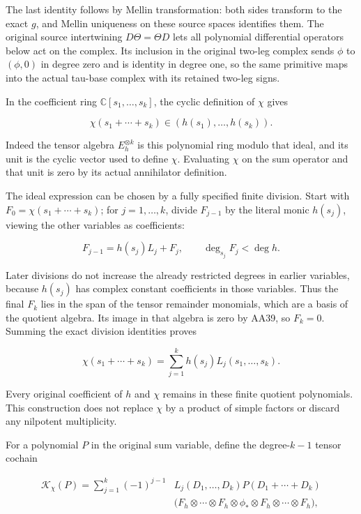\documentclass{article}
\begin{document}
The last identity follows by Mellin transformation: both sides transform to the exact \(g\), and Mellin uniqueness on these source spaces identifies them. The original source intertwining \(D\Theta=\Theta D\) lets all polynomial differential operators below act on the complex. Its inclusion in the original two-leg complex sends \(\phi\) to \((\phi,0)\) in degree zero and is identity in degree one, so the same primitive maps into the actual tau-base complex with its retained two-leg signs.

In the coefficient ring \(\mathbb C[s_1,\ldots,s_k]\), the cyclic definition of \(\chi\) gives

\[
\chi(s_1+\cdots+s_k)\in(h(s_1),\ldots,h(s_k)).
\tag{AA39}
\]

Indeed the tensor algebra \(E_h^{\otimes k}\) is this polynomial ring modulo that ideal, and its unit is the cyclic vector used to define \(\chi\). Evaluating \(\chi\) on the sum operator and that unit is zero by its actual annihilator definition.

The ideal expression can be chosen by a fully specified finite division. Start with \(F_0=\chi(s_1+\cdots+s_k)\); for \(j=1,\ldots,k\), divide \(F_{j-1}\) by the literal monic \(h(s_j)\), viewing the other variables as coefficients:

\[
F_{j-1}=h(s_j)L_j+F_j,\qquad\deg_{s_j}F_j<\deg h.
\tag{AA40}
\]

Later divisions do not increase the already restricted degrees in earlier variables, because \(h(s_j)\) has complex constant coefficients in those variables. Thus the final \(F_k\) lies in the span of the tensor remainder monomials, which are a basis of the quotient algebra. Its image in that algebra is zero by AA39, so \(F_k=0\). Summing the exact division identities proves

\[
\chi(s_1+\cdots+s_k)=\sum_{j=1}^k h(s_j)L_j(s_1,\ldots,s_k).
\tag{AA41}
\]

Every original coefficient of \(h\) and \(\chi\) remains in these finite quotient polynomials. This construction does not replace \(\chi\) by a product of simple factors or discard any nilpotent multiplicity.

For a polynomial \(P\) in the original sum variable, define the degree-\(k-1\) tensor cochain

\[
\begin{aligned}
\mathcal K_\chi(P)=\sum_{j=1}^k(-1)^{j-1}
&L_j(D_1,\ldots,D_k)P(D_1+\cdots+D_k)\\
&\bigl(F_h\otimes\cdots\otimes F_h
\otimes\phi_*\otimes F_h\otimes\cdots\otimes F_h\bigr),
\end{aligned}
\tag{AA42}
\]
\end{document}
